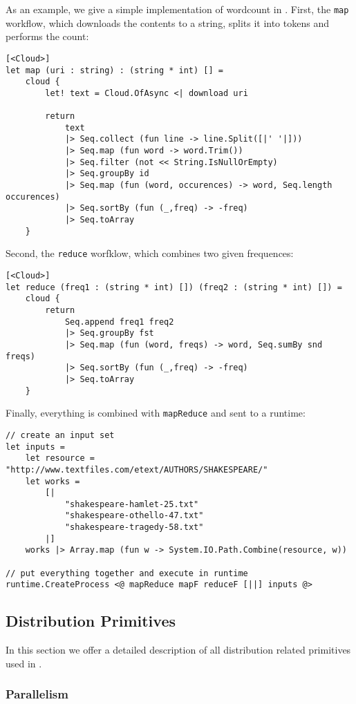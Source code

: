 As an example, we give a simple implementation of wordcount in \mbrace{}.
First, the \texttt{map} workflow, which downloads the contents to a string,
splits it into tokens and performs the count:
\begin{lstlisting}
[<Cloud>]
let map (uri : string) : (string * int) [] =
    cloud {
        let! text = Cloud.OfAsync <| download uri

        return
            text
            |> Seq.collect (fun line -> line.Split([|' '|]))
            |> Seq.map (fun word -> word.Trim())
            |> Seq.filter (not << String.IsNullOrEmpty)
            |> Seq.groupBy id
            |> Seq.map (fun (word, occurences) -> word, Seq.length occurences)
            |> Seq.sortBy (fun (_,freq) -> -freq)
            |> Seq.toArray
    }
\end{lstlisting}
Second, the \texttt{reduce} worfklow, which combines two given frequences:
\begin{lstlisting}
[<Cloud>]
let reduce (freq1 : (string * int) []) (freq2 : (string * int) []) =
    cloud {
        return
            Seq.append freq1 freq2
            |> Seq.groupBy fst
            |> Seq.map (fun (word, freqs) -> word, Seq.sumBy snd freqs)
            |> Seq.sortBy (fun (_,freq) -> -freq)
            |> Seq.toArray
    }
\end{lstlisting}
Finally, everything is combined with \texttt{mapReduce} and sent to a runtime:
\begin{lstlisting}
// create an input set
let inputs =
    let resource = "http://www.textfiles.com/etext/AUTHORS/SHAKESPEARE/"
    let works =
        [|
            "shakespeare-hamlet-25.txt"
            "shakespeare-othello-47.txt"
            "shakespeare-tragedy-58.txt"
        |]
    works |> Array.map (fun w -> System.IO.Path.Combine(resource, w))
    
// put everything together and execute in runtime
runtime.CreateProcess <@ mapReduce mapF reduceF [||] inputs @>
\end{lstlisting}

\subsection{Distribution Primitives}

In this section we offer a detailed description of all distribution related
primitives used in \mbrace{}.

\subsubsection*{Parallelism}

